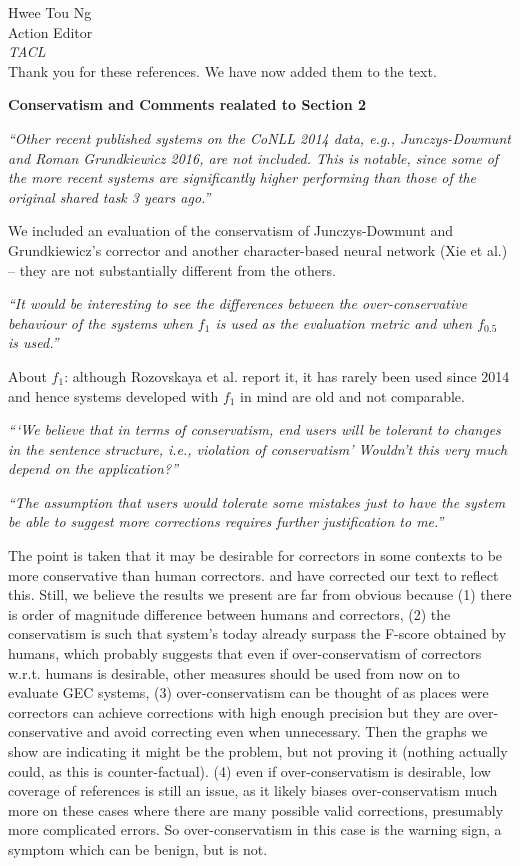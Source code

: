 \documentclass[11pt,letterpaper]{letter}
\begin{document}
\begin{letter}{%
Hwee Tou Ng\\
Action Editor\\
{\em TACL}\\
}
Thank you for these references. We have now added them to the text.
	
{\large\bf Conservatism and Comments realated to Section 2}

\emph{``Other recent published systems on the CoNLL 2014 data, e.g., Junczys-Dowmunt
	and Roman Grundkiewicz 2016, are not included. This is notable, since some
	of the more recent systems are significantly higher performing than those of
	the original shared task 3 years ago.''}
	
We included an evaluation of the conservatism of Junczys-Dowmunt and Grundkiewicz's corrector  and another character-based neural network (Xie et al.) -- they are not substantially different from the others.


\emph{``It would be interesting to see the differences between the over-conservative
	behaviour of the systems when $f_1$ is used as the evaluation metric and when
	$f_{0.5}$ is used.''}

About $f_1$: although Rozovskaya et al. report it, it has rarely been used since 2014 and hence systems developed with $f_1$ in mind are old and not comparable.
	
\emph{```We believe that in terms of conservatism, end users will be tolerant to
	changes in the sentence structure, i.e., violation of conservatism' Wouldn't
	this very much depend on the application?''
	}

\emph{``The assumption that users would tolerate
	some mistakes just to have the system be able to suggest more corrections
	requires further justification to me.''
	}
	
The point is taken that it may be desirable for correctors in some contexts to be more conservative than human correctors. and have corrected our text to reflect this. Still, we believe the results we present are far from obvious because (1) there is order of magnitude difference between humans and correctors, (2) the conservatism is such that system's today already surpass the F-score obtained by humans, which probably suggests that even if over-conservatism of correctors w.r.t. humans is desirable, other measures should be used from now on to evaluate GEC systems, (3) over-conservatism can be thought of as places were correctors can achieve corrections with high enough precision but they are over-conservative and avoid correcting even when unnecessary. Then the graphs we show are indicating it might be the problem, but not proving it (nothing actually could, as this is counter-factual). (4) even if over-conservatism is desirable, low coverage of references is still an issue, as it likely biases over-conservatism much more on these cases where there are many possible valid corrections, presumably more complicated errors. So over-conservatism in this case is the warning sign, a symptom which can be benign, but is not.


\end{letter}
\end{document}
